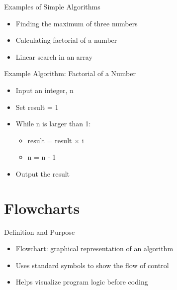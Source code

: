 \documentclass[12pt, aspectratio=169]{beamer}
\begin{document}
    \begin{frame}{Examples of Simple Algorithms}
        \begin{itemize}
            \item Finding the maximum of three numbers
            \item Calculating factorial of a number
            \item Linear search in an array
        \end{itemize}
    \end{frame}


    \begin{frame}{Example Algorithm: Factorial of a Number}
        \begin{itemize}
            \item Input an integer, n
            \item Set result = 1
            \item While n is larger than 1:
            \begin{itemize}
                \item result = result × i
                \item n = n - 1
            \end{itemize}
            \item Output the result
        \end{itemize}
    \end{frame}


    \section{Flowcharts}


    \begin{frame}{Definition and Purpose}
        \begin{itemize}
            \item Flowchart: graphical representation of an algorithm
            \item Uses standard symbols to show the flow of control
            \item Helps visualize program logic before coding
        \end{itemize}
    \end{frame}
\end{document}
